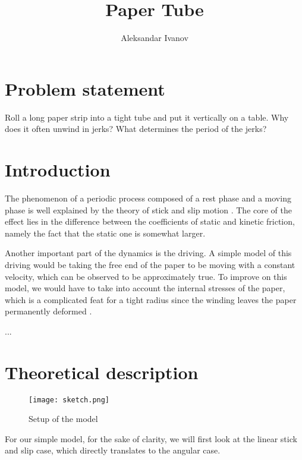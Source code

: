 \documentclass[10pt,a4paper,twocolumn]{article}
\begin{document}
\title{Paper Tube}
\author{Aleksandar Ivanov}
\date{}
\maketitle

\clearpage

\section{Problem statement}

Roll a long paper strip into a tight tube and put it vertically on a table. Why does it often unwind in jerks? What determines the period of the jerks?

\section{Introduction}

The phenomenon of a periodic process composed of a rest phase and a moving phase is well explained by the theory of stick and slip motion \cite{apho}. The core of the effect lies in the difference between the coefficients of static and kinetic friction, namely the fact that the static one is somewhat larger. 

Another important part of the dynamics is the driving. A simple model of this driving would be taking the free end of the paper to be moving with a constant velocity, which can be observed to be approximately true. To improve on this model, we would have to take into account the internal stresses of the paper, which is a complicated feat for a tight radius since the winding leaves the paper permanently deformed \cite{CASTRO20032083}.



...

\section{Theoretical description}

\begin{figure}[H]
    \centering
    \captionsetup{justification=centering}
    \texttt{[image: sketch.png]}
    \caption{Setup of the model}
    \label{fig:sketch}
\end{figure}

For our simple model, for the sake of clarity, we will first look at the linear stick and slip case, which directly translates to the angular case.
\end{document}
